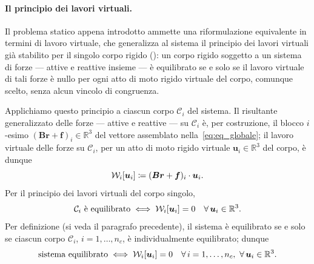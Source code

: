 


\paragraph{Il principio dei lavori virtuali.}
Il problema statico appena introdotto ammette una riformulazione
equivalente in termini di lavoro virtuale, che generalizza al
sistema il principio dei lavori virtuali già stabilito per il
singolo corpo rigido (): un corpo rigido
soggetto a un sistema di forze --- attive e reattive insieme ---
è equilibrato se e solo se il lavoro virtuale di tali forze è
nullo per ogni atto di moto rigido virtuale del corpo, comunque
scelto, senza alcun vincolo di congruenza.
\medskip

Applichiamo questo principio a ciascun corpo $\mathcal C_i$ del
sistema. Il risultante generalizzato delle forze --- attive e
reattive --- su $\mathcal C_i$ è, per costruzione, il blocco
$i$-esimo $(\bm B\bm r+\bm f)_i\in\mathbb R^3$ del vettore
assemblato nella~\eqref{eq:eq_globale}; il lavoro virtuale delle
forze su $\mathcal C_i$, per un atto di moto rigido virtuale
$\bm u_i\in\mathbb R^3$ del corpo, è dunque
\begin{equation}
	\mathcal{W}_i[\bm u_i]\coloneqq(\bm B\bm r+\bm f)_i\cdot \bm u_i.
\end{equation}
Per il principio dei lavori virtuali del corpo singolo,
\begin{equation}
	\mathcal C_i \text{ è equilibrato} \iff
	\mathcal{W}_i[\bm u_i] = 0
	\quad \forall\,\bm u_i\in\mathbb R^3.
\end{equation}
Per definizione (si veda il paragrafo precedente), il sistema è
equilibrato se e solo se ciascun corpo $\mathcal C_i$,
$i=1,\dots,n_c$, è individualmente equilibrato; dunque
\begin{equation}\label{eq:plv_percorpo}
	\text{sistema equilibrato} \iff
	\mathcal{W}_i[\bm u_i]=0 \quad \forall\, i=1,\dots,n_c,\
	\forall\,\bm u_i\in\mathbb R^3.
\end{equation}


